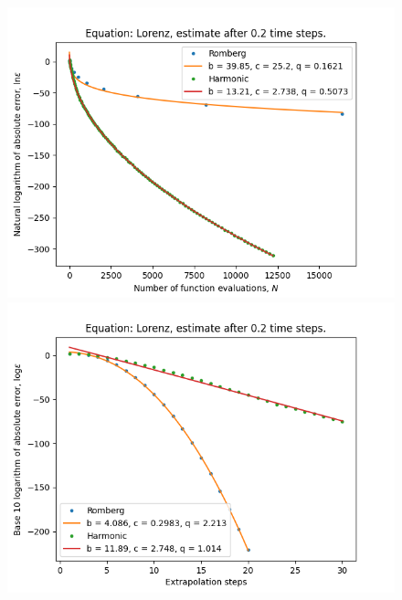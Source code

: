 \begin{figure}[H]
\centering
\begin{minipage}{0.45\textwidth}
\centering
\includegraphics[scale=0.45]{emr_plots/lorenz_02_hp_trend.png}
\end{minipage}
\begin{minipage}{0.45\textwidth}
\centering
\includegraphics[scale=0.45]{emr_plots/lorenz_02_hp_steps.png}
\end{minipage}
\end{figure}

